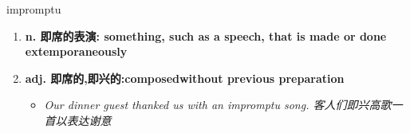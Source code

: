 
\begin{frame}
{\huge impromptu}
\begin{center}
\begin{enumerate}\Large
  \item \textbf{n. 即席的表演: something, such as a speech, that is made or done extemporaneously}
  \item \textbf{adj. 即席的,即兴的:composedwithout previous preparation}
  \begin{itemize}
    \item \em{\Large{Our dinner guest thanked us with an impromptu song. 客人们即兴高歌一首以表达谢意}}
  \end{itemize}
\end{enumerate}
\end{center}
\end{frame}
